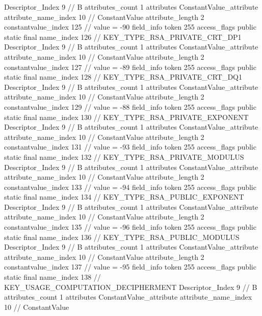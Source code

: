 {{{{{				Descriptor_Index	9		// B
				attributes_count	1
				attributes {
				ConstantValue_attribute {
					attribute_name_index	10		// ConstantValue
					attribute_length	2
					constantvalue_index	125		// value = -90
				}
				}
			}
			field_info {
				token	255
				access_flags	public static final
				name_index	126		// KEY_TYPE_RSA_PRIVATE_CRT_DP1
				Descriptor_Index	9		// B
				attributes_count	1
				attributes {
				ConstantValue_attribute {
					attribute_name_index	10		// ConstantValue
					attribute_length	2
					constantvalue_index	127		// value = -89
				}
				}
			}
			field_info {
				token	255
				access_flags	public static final
				name_index	128		// KEY_TYPE_RSA_PRIVATE_CRT_DQ1
				Descriptor_Index	9		// B
				attributes_count	1
				attributes {
				ConstantValue_attribute {
					attribute_name_index	10		// ConstantValue
					attribute_length	2
					constantvalue_index	129		// value = -88
				}
				}
			}
			field_info {
				token	255
				access_flags	public static final
				name_index	130		// KEY_TYPE_RSA_PRIVATE_EXPONENT
				Descriptor_Index	9		// B
				attributes_count	1
				attributes {
				ConstantValue_attribute {
					attribute_name_index	10		// ConstantValue
					attribute_length	2
					constantvalue_index	131		// value = -93
				}
				}
			}
			field_info {
				token	255
				access_flags	public static final
				name_index	132		// KEY_TYPE_RSA_PRIVATE_MODULUS
				Descriptor_Index	9		// B
				attributes_count	1
				attributes {
				ConstantValue_attribute {
					attribute_name_index	10		// ConstantValue
					attribute_length	2
					constantvalue_index	133		// value = -94
				}
				}
			}
			field_info {
				token	255
				access_flags	public static final
				name_index	134		// KEY_TYPE_RSA_PUBLIC_EXPONENT
				Descriptor_Index	9		// B
				attributes_count	1
				attributes {
				ConstantValue_attribute {
					attribute_name_index	10		// ConstantValue
					attribute_length	2
					constantvalue_index	135		// value = -96
				}
				}
			}
			field_info {
				token	255
				access_flags	public static final
				name_index	136		// KEY_TYPE_RSA_PUBLIC_MODULUS
				Descriptor_Index	9		// B
				attributes_count	1
				attributes {
				ConstantValue_attribute {
					attribute_name_index	10		// ConstantValue
					attribute_length	2
					constantvalue_index	137		// value = -95
				}
				}
			}
			field_info {
				token	255
				access_flags	public static final
				name_index	138		// KEY_USAGE_COMPUTATION_DECIPHERMENT
				Descriptor_Index	9		// B
				attributes_count	1
				attributes {
				ConstantValue_attribute {
					attribute_name_index	10		// ConstantValue
}}}}}}}

